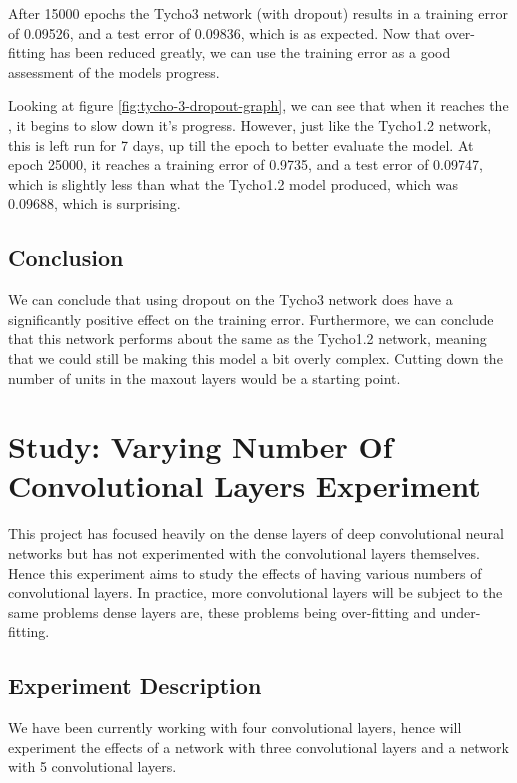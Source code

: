 \documentclass[12pt,a4paper,oneside,oldfontcommands]{memoir}
\begin{document}
\begin{Declaration Of OriginalityOrginality}
After 15000 epochs the Tycho3 network (with dropout) results in a training error of 0.09526, and a test error of 0.09836, which is as expected. Now that over-fitting has been reduced greatly, we can use the training error as a good assessment of the models progress. 

Looking at figure \ref{fig:tycho-3-dropout-graph}, we can see that when it reaches the , it begins to slow down it's progress. However, just like the Tycho1.2 network, this is left run for 7 days, up till the  epoch to better evaluate the model. At epoch 25000, it reaches a training error of 0.9735, and a test error of 0.09747, which is slightly less than what the Tycho1.2 model produced, which was 0.09688, which is surprising.

\section{Conclusion}

We can conclude that using dropout on the Tycho3 network does have a significantly positive effect on the training error. Furthermore, we can conclude that this network performs about the same as the Tycho1.2 network, meaning that we could still be making this model a bit overly complex. Cutting down the number of units in the maxout layers would be a starting point.


\chapter{Study: Varying Number Of Convolutional Layers Experiment} \label{conv-exp}

This project has focused heavily on the dense layers of deep convolutional neural networks but has not experimented with the convolutional layers themselves. Hence this experiment aims to study the effects of having various numbers of convolutional layers. In practice, more convolutional layers will be subject to the same problems dense layers are, these problems being over-fitting and under-fitting. 


\section{Experiment Description}

We have been currently working with four convolutional layers, hence will experiment the effects of a network with three convolutional layers and a network with 5 convolutional layers. 


\end{Declaration Of OriginalityOrginality}
\end{document}
